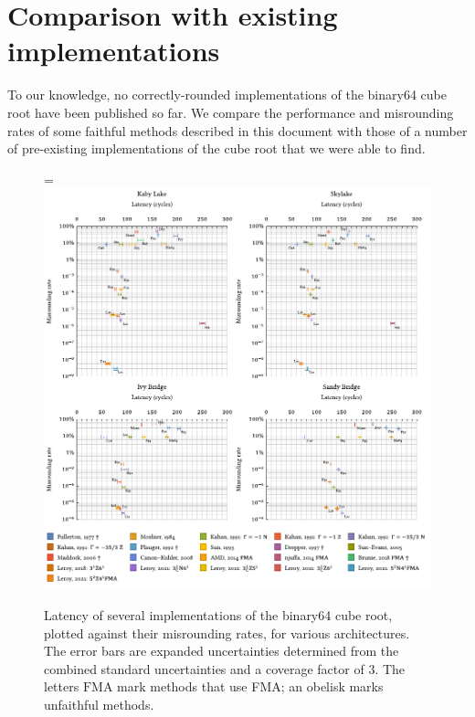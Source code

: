 ﻿\documentclass[10pt, a4paper, twoside]{basestyle}
\begin{document}
\section{Comparison with existing implementations}
\label{Comparison}
To our knowledge, no correctly-rounded implementations of the binary64 cube root have been published so far.
We compare the performance and misrounding rates of some faithful methods described in this document with those
of a number of pre-existing implementations of the cube root that we were able to find.
\begin{figure}[t!]
\begin{adjustwidth}{-4cm}{}\hsize=\linewidth
\includegraphics[width=\linewidth]{cbrt_latency_misrounding.pdf}
\cbstart{}\caption{Latency of several implementations of the binary64 cube root, plotted against their misrounding rates, for various architectures.
The error bars are expanded uncertainties determined from the combined standard uncertainties and a coverage factor of $3$.
The letters $\mathrm{FMA}$ mark methods that use FMA; an obelisk marks unfaithful methods.}\cbend{}
\end{adjustwidth}
\end{figure}
\end{document}
